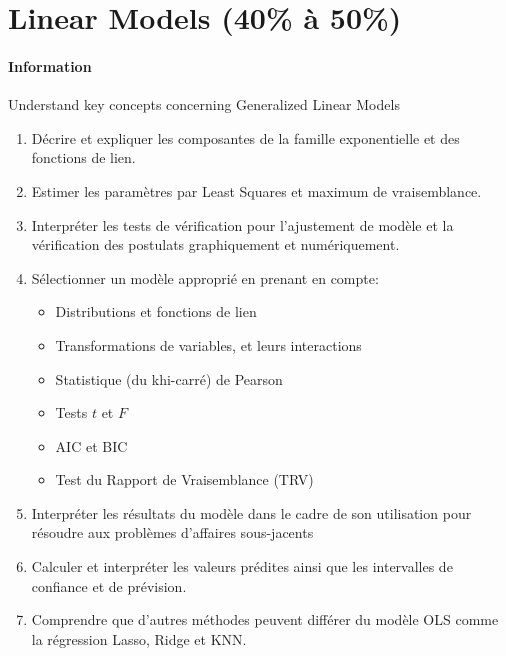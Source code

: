 \documentclass[12pt, titlepage, french]{report}
\begin{document}
\newpage
\chapter[Linear Models]{Linear Models (40\% à 50\%)}

\subsubsection{Information}

\begin{distributions}[Objective]
Understand key concepts concerning Generalized Linear Models
\end{distributions}

\begin{outcomes}
\begin{enumerate}
	\item	Décrire et expliquer les composantes de la famille exponentielle et des fonctions de lien.
	\item	Estimer les paramètres par Least Squares et maximum de vraisemblance.
	\item	Interpréter les tests de vérification pour l'ajustement de modèle et la vérification des postulats graphiquement et numériquement.
	\item	Sélectionner un modèle approprié en prenant en compte:
	\begin{itemize}
		\item	Distributions et fonctions de lien
		\item	Transformations de variables, et leurs interactions
		\item	Statistique (du khi-carré) de Pearson
		\item	Tests $t$ et $F$
		\item	AIC et BIC
		\item	Test du Rapport de Vraisemblance (TRV)
	\end{itemize}
	\item	Interpréter les résultats du modèle dans le cadre de son utilisation pour résoudre aux problèmes d'affaires sous-jacents
	\item	Calculer et interpréter les valeurs prédites ainsi que les intervalles de confiance et de prévision.
	\item	Comprendre que d'autres méthodes peuvent différer du modèle OLS comme la régression Lasso, Ridge et KNN.
\end{enumerate}
\end{outcomes}
\end{document}

